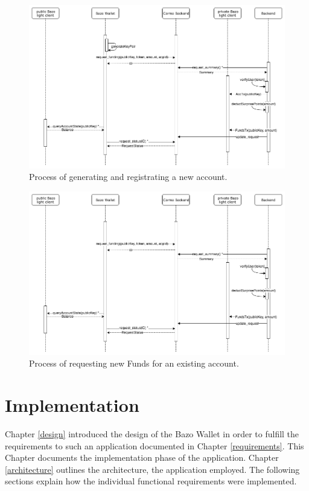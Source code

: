 \begin{figure}
\centering
\includegraphics[width=1\textwidth]{diagrams/onboarding.png}
\caption{\label{fig:onboarding}Process of generating and registrating a new account.}
\end{figure}

\begin{figure}
\centering
\includegraphics[width=1\textwidth]{diagrams/topup.png}
\caption{\label{fig:topup}Process of requesting new Funds for an existing account.}
\end{figure}



\chapter{Implementation}
Chapter \ref{design} introduced the design of the Bazo Wallet in order to fulfill the requirements to such an application documented in Chapter \ref{requirements}. This Chapter documents the implementation phase of the application. Chapter  \ref{architecture} outlines the architecture, the application employed. The following sections explain how the individual functional requirements were implemented.

